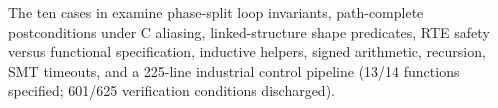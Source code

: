 




{The ten cases in  examine phase-split loop
invariants, path-complete postconditions under C aliasing, linked-structure
shape predicates, RTE safety versus functional specification, inductive
helpers, signed arithmetic, recursion, SMT timeouts, and a 225-line
industrial control pipeline (13/14 functions specified; 601/625 verification
conditions discharged).}
